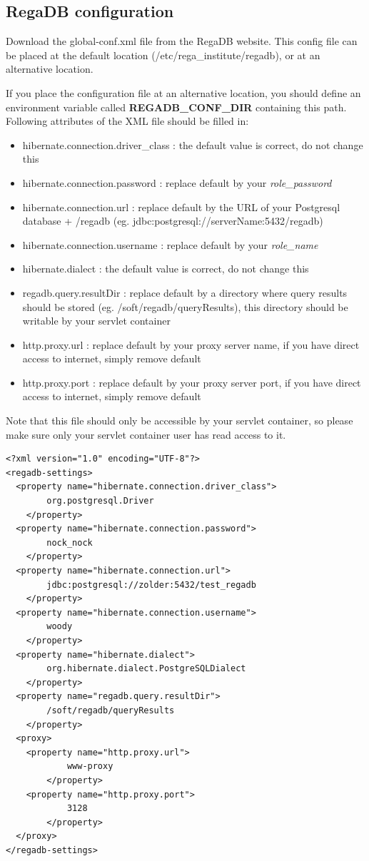 \subsection{RegaDB configuration}
Download the global-conf.xml file from the RegaDB website. This config file can be placed at the default location (/etc/rega\_institute/regadb), or at an alternative location.

If you place the configuration file at an alternative location, you should define an environment variable called \textbf{REGADB\_CONF\_DIR} containing this path.
Following attributes of the XML file should be filled in:
\begin{itemize}
\item hibernate.connection.driver\_class : the default value is correct, do not change this
\item hibernate.connection.password : replace default by your \textit{role\_password}
\item hibernate.connection.url : replace default by the URL of your Postgresql database + /regadb (eg. jdbc:postgresql://serverName:5432/regadb)
\item hibernate.connection.username : replace default by your \textit{role\_name}
\item hibernate.dialect : the default value is correct, do not change this
\item regadb.query.resultDir : replace default by a directory where query results should be stored (eg. /soft/regadb/queryResults), this directory should be writable by your servlet container
\item http.proxy.url : replace default by your proxy server name, if you have direct access to internet, simply remove default
\item http.proxy.port : replace default by your proxy server port, if you have direct access to internet, simply remove default
\end{itemize}

Note that this file should only be accessible by your servlet container, so please make sure only your servlet container user has read access to it.

\begin{lstlisting}
<?xml version="1.0" encoding="UTF-8"?>
<regadb-settings>
  <property name="hibernate.connection.driver_class">
		org.postgresql.Driver
	</property>
  <property name="hibernate.connection.password">
		nock_nock
	</property>
  <property name="hibernate.connection.url">
		jdbc:postgresql://zolder:5432/test_regadb
	</property>
  <property name="hibernate.connection.username">
		woody
	</property>
  <property name="hibernate.dialect">
		org.hibernate.dialect.PostgreSQLDialect
	</property>
  <property name="regadb.query.resultDir">
		/soft/regadb/queryResults
	</property>
  <proxy>
    <property name="http.proxy.url">
			www-proxy
		</property>
    <property name="http.proxy.port">
			3128
		</property>
  </proxy>
</regadb-settings>
\end{lstlisting}

